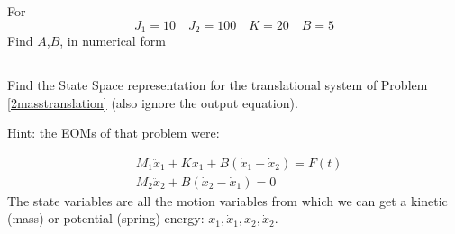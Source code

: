 \documentclass{article}	%
\begin{document}
%


\subsubsection{}
For
\[
J_1 = 10 \quad J_2 = 100 \quad K=20 \quad B=5
\]
Find $A$,$B$, in numerical form

%


\subsection{}\label{ICPss_2mass}
Find the State Space representation for the translational system of Problem \ref{2masstranslation}
(also ignore the output equation).

Hint: the EOMs of that problem were:

\begin{align*}
&M_1\ddot{x}_1+Kx_1+B(\dot{x}_1-\dot{x}_2) = F(t)  \\
&M_2\ddot{x}_2+B(\dot{x}_2-\dot{x}_1) = 0
\end{align*}
The state variables are all the motion variables from which we can get a kinetic (mass) or potential
(spring) energy:  $x_1, \dot{x}_1,x_2, \dot{x}_2$.
\end{document}
